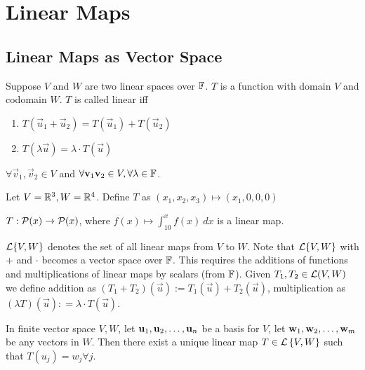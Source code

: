 \section{Linear Maps}
\begin{center}
\end{center}
\subsection{Linear Maps as Vector Space}
Suppose $V$ and $W$ are two linear spaces over $\mathbb F$. $T$ is a function with domain $V$ and codomain $W$. $T$ is called linear iff 
\begin{enumerate}
    \item $T(\vec u_1 + \vec u_2) = T(\vec u_1) + T(\vec u_2)$
    \item $T(\lambda \vec u) = \lambda \cdot T(\vec u)$
\end{enumerate}
$\forall \vec{v}_1, \vec{v}_2 \in V$ and $\forall \mathbf v_1 \mathbf v_2 \in V, \forall \lambda\in \mathbb F$.
\begin{example}
    Let $V = \mathbb R^3, W = \mathbb R^4$. Define $T$ as $(x_1, x_2, x_3) \mapsto (x_1,0,0,0)$
\end{example}
\begin{example}
    $T: \mathcal P(x) \to \mathcal P(x)$, where $\displaystyle f(x) \mapsto \int_{10}^x f(x) \ dx$ is a linear map.
\end{example}
\begin{definition}
    $\mathcal L\{V, W\}$ denotes the set of all linear maps from $V$ to $W$. Note that $\mathcal L\{V, W\}$ with $+$ and $\cdot$ becomes a vector space over $\mathbb F$. This requires the additions of functions and multiplications of linear maps by scalars (from $\mathbb F$). Given $T_1, T_2 \in \mathcal L(V,W)$ we define addition as $(T_1 + T_2)(\vec u) := T_1(\vec u) + T_2(\vec u)$, multiplication as $(\lambda T)(\vec u) : = \lambda \cdot T(\vec u)$. 
\end{definition}
\begin{theorem}
    In finite vector space $V,W$, let ${\mathbf u}_1,{\mathbf u}_2, \ldots, {\mathbf u}_{n}$ be a basis for $V$, let ${\mathbf w}_1,{\mathbf w}_2, \ldots, {\mathbf w}_{m}$ be any vectors in $W$. Then there exist a unique linear map $T \in \mathcal L \left\{ V, W \right\}$ such that $T(u_j) = w_j \forall j$.
\end{theorem}
